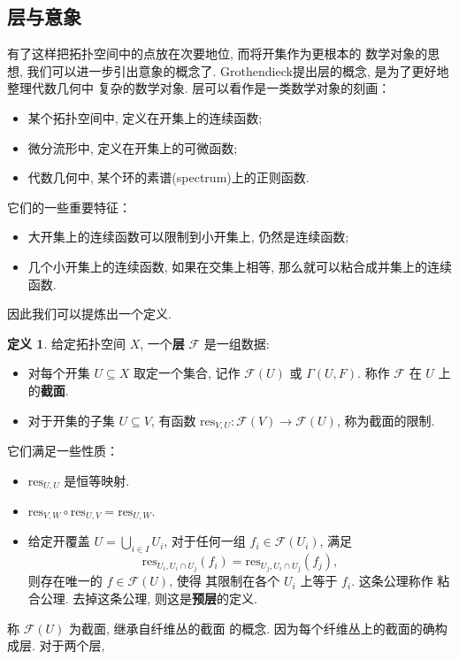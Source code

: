 \documentclass[UTF8]{ctexbook}
\theoremstyle{plain}
\theoremstyle{definition}
\newtheorem{definition}{定义}[chapter]
\theoremstyle{remark}
\begin{document}
\subsection{层与意象}
有了这样把拓扑空间中的点放在次要地位, 而将开集作为更根本的
数学对象的思想, 我们可以进一步引出意象的概念了.
Grothendieck提出层的概念, 是为了更好地整理代数几何中
复杂的数学对象. 层可以看作是一类数学对象的刻画：
\begin{itemize}
\item 某个拓扑空间中, 定义在开集上的连续函数;
\item 微分流形中, 定义在开集上的可微函数;
\item 代数几何中, 某个环的素谱(spectrum)上的正则函数.~\cite[第二章, 例1.0.1]{hartshorne:1977:ag}
\end{itemize}
它们的一些重要特征：
\begin{itemize}
\item 大开集上的连续函数可以限制到小开集上, 仍然是连续函数;
\item 几个小开集上的连续函数, 如果在交集上相等, 那么就可以粘合成并集上的连续函数.
\end{itemize}
因此我们可以提炼出一个定义.
\begin{definition}
给定拓扑空间 \(X\), 一个\textbf{层} \(\mathscr F\) 是一组数据:
\begin{itemize}
\item 对每个开集 \(U \subseteq X\) 取定一个集合,
记作 \(\mathscr F(U)\) 或 \(\Gamma(U, F)\).
称作 \(\mathscr F\) 在 \(U\) 上的\textbf{截面}.
\item 对于开集的子集 \(U \subseteq V\), 有函数
\(\mathrm{res}_{V,U} : \mathscr F(V) \to \mathscr F(U)\),
称为截面的限制.
\end{itemize}
它们满足一些性质：
\begin{itemize}
\item \(\mathrm{res}_{U,U}\) 是恒等映射.
\item \(\mathrm{res}_{V, W}\circ \mathrm{res}_{U,V} = \mathrm{res}_{U, W}\).
\item 给定开覆盖 \(U = \bigcup_{i\in I} U_i\),
对于任何一组 \(f_i \in \mathscr F(U_i)\), 满足
\[\mathrm{res}_{U_i, U_i \cap U_j}(f_i)
= \mathrm{res}_{U_j, U_i \cap U_j}(f_j),\]
则存在唯一的 \(f \in \mathscr F(U)\), 使得
其限制在各个 \(U_i\) 上等于 \(f_i\). 这条公理称作
粘合公理. 去掉这条公理, 则这是\textbf{预层}的定义.
\end{itemize}
\end{definition}
称 \(\mathscr F(U)\) 为截面, 继承自纤维丛的截面
的概念. 因为每个纤维丛上的截面的确构成层. 对于两个层,
\end{document}
